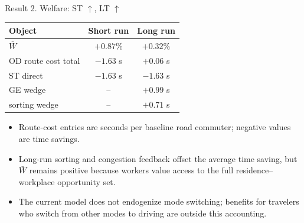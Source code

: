 \documentclass[11pt,aspectratio=169]{beamer}
\newcommand{\good}[1]{\textcolor{blue!70!black}{#1}}
\newcommand{\bad}[1]{\textcolor{red!70!black}{#1}}
\begin{document}
\begin{frame}[label=result2]{Result 2. Welfare: ST $\uparrow$, LT $\uparrow$}
\begin{center}\small
\begin{tabular}{lcc}
\toprule
Object & Short run & Long run \\
\midrule
$\bar W$ & \good{$+0.87\%$} & \good{$+0.32\%$} \\
OD route cost total & \good{$-1.63$ s} & \bad{$+0.06$ s} \\
\quad ST direct & \good{$-1.63$ s} & \good{$-1.63$ s} \\
\quad GE wedge & -- & \bad{$+0.99$ s} \\
\quad sorting wedge & -- & \bad{$+0.71$ s} \\
\bottomrule
\end{tabular}
\end{center}
\vspace{0.1em}

\vspace{0.25em}
\begin{itemize}\footnotesize
  \item Route-cost entries are seconds per baseline road commuter; negative values are time savings.
  \item Long-run sorting and congestion feedback offset the average time saving, but $\bar W$ remains positive because workers value access to the full residence--workplace opportunity set.
  \item The current model does not endogenize mode switching; benefits for travelers who switch from other modes to driving are outside this accounting.
\end{itemize}
\end{frame}
\end{document}
